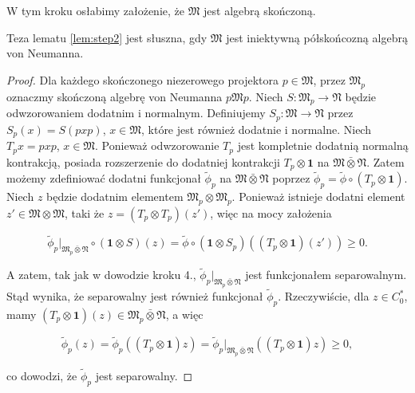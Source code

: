 W tym kroku osłabimy założenie, że $\mathfrak{M}$ jest algebrą skończoną.
\begin{Lemma}
Teza lematu \ref{lem:step2} jest słuszna, gdy
$\mathfrak{M}$ jest iniektywną półskońcozną algebrą von Neumanna.
\end{Lemma}
\begin{proof}
Dla każdego skończonego niezerowego projektora $p \in \mathfrak{M}$,
przez $\mathfrak{M}_{p}$ oznaczmy skończoną algebrę von Neumanna
$p \mathfrak{M} p$.
Niech $S : \mathfrak{M}_{p} \rightarrow \mathfrak{N}$ będzie odwzorowaniem
dodatnim i normalnym.
Definiujemy $S_{p} : \mathfrak{M} \rightarrow \mathfrak{N}$
przez $S_{p}(x) = S(pxp)$, $x \in \mathfrak{M}$,
które jest również dodatnie i normalne.
Niech $T_{p}x = p x p$, $x \in \mathfrak{M}$.
Ponieważ odwzorowanie $T_{p}$ jest kompletnie dodatnią normalną kontrakcją,
posiada rozszerzenie do dodatniej kontrakcji
$T_{p} \otimes \mathbf{1}$ na $\mathfrak{M} \bar{\otimes} \mathfrak{N}$.
Zatem możemy zdefiniować dodatni funkcjonał $\tilde{\phi}_{p}$ na
$\mathfrak{M} \bar{\otimes} \mathfrak{N}$ poprzez
$\tilde{\phi}_{p} = \tilde{\phi} \circ (T_{p} \otimes \mathbf{1})$.
Niech $z$ będzie dodatnim elementem $\mathfrak{M}_{p} \otimes \mathfrak{M}_{p}$.
Ponieważ istnieje dodatni element $z' \in \mathfrak{M} \otimes \mathfrak{M}$,
taki że $z = (T_{p} \otimes T_{p})(z')$, więc na mocy założenia
\begin{linenomath*}
 \begin{equation}
\tilde{\phi}_{p} \big|_{\mathfrak{M}_{p} \bar{\otimes} \mathfrak{N}}
\circ (\mathbf{1} \otimes S)(z) =
\tilde{\phi} \circ (\mathbf{1} \otimes S_{p})
\left( (T_{p} \otimes \mathbf{1})(z') \right ) \geq 0.
 \end{equation}
\end{linenomath*}
A zatem, tak jak w dowodzie kroku 4.,
$\tilde{\phi}_{p} \big|_{\mathfrak{M}_{p} \bar{\otimes} \mathfrak{N}}$
jest funkcjonałem separowalnym.
Stąd wynika, że separowalny jest również funkcjonał $\tilde{\phi}_{p}$.
Rzeczywiście, dla $z\in C_{0}^{*}$, mamy
$(T_{p} \otimes \mathbf{1})(z) \in
\mathfrak{M}_{p} \bar{\otimes} \mathfrak{N}$, a więc
\begin{linenomath*}
 \begin{equation}
\tilde{\phi}_{p}(z) = \tilde{\phi}_{p}((T_{p} \otimes \mathbf{1}) z) =
\tilde{\phi}_{p} \big|_{\mathfrak{M}_{p} \bar{\otimes} \mathfrak{N}}
((T_{p} \otimes \mathbf{1}) z) \geq 0,
 \end{equation}
\end{linenomath*}
co dowodzi, że $\tilde{\phi}_{p}$ jest separowalny.


\end{proof}
